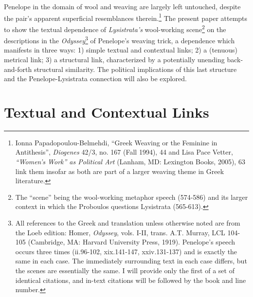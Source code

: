 \documentclass[12pt]{article}
\begin{document}
Penelope in the domain of wool and weaving are largely left untouched, despite the pair's apparent superficial resemblances therein.\footnote{Ionna Papadopoulou-Belmehdi, ``Greek Weaving or the Feminine in Antithesis'', \textit{Diogenes} 42/3, no. 167 (Fall 1994), 44 and Lisa Pace Vetter, \textit{``Women's Work'' as Political Art} (Lanham, MD: Lexington Books, 2005), 63 link them insofar as both are part of a larger weaving theme in Greek literature.} The present paper attempts to show the textual dependence of \textit{Lysistrata's} wool-working scene\footnote{The ``scene'' being the wool-working metaphor speech (574-586) and its larger context in which the Proboulos questions Lysistrata (565-613).} on the descriptions in the \textit{Odyssey}\footnote{All references to the Greek and translation unless otherwise noted are from the Loeb edition: Homer, \textit{Odyssey}, vols. I-II, trans. A.T. Murray, LCL 104-105 (Cambridge, MA: Harvard University Press, 1919). Penelope's speech occurs three times (ii.96-102, xix.141-147, xxiv.131-137) and is exactly the same in each case. The immediately surrounding text in each case differs, but the scenes are essentially the same. I will provide only the first of a set of identical citations, and in-text citations will be followed by the book and line number.} of Penelope's weaving trick, a dependence which manifests in three ways: 1) simple textual and contextual links; 2) a (tenuous) metrical link; 3) a structural link, characterized by a potentially unending back-and-forth structural similarity. The political implications of this last structure and the Penelope-Lysistrata connection will also be explored.

\section{Textual and Contextual Links}
\end{document}
